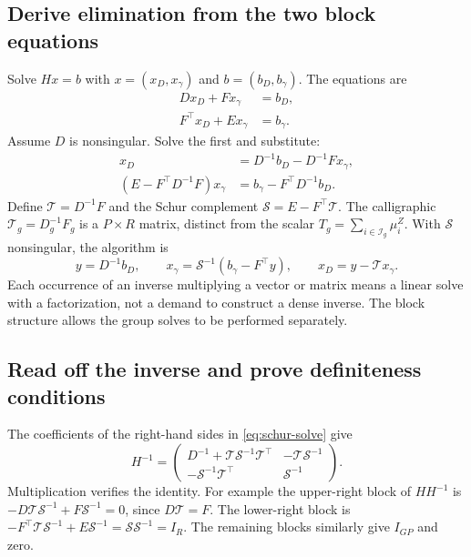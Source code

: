 \documentclass[11pt,a4paper]{article}
\numberwithin{equation}{section}
\begin{document}
\subsection{Derive elimination from the two block equations}
Solve $Hx=b$ with $x=(x_D,x_\gamma)$ and $b=(b_D,b_\gamma)$.
The equations are
\begin{align}
 Dx_D+Fx_\gamma&=b_D,\\
 F^\top x_D+Ex_\gamma&=b_\gamma .
\end{align}
Assume $D$ is nonsingular. Solve the first and substitute:
\begin{align}
 x_D&=D^{-1}b_D-D^{-1}Fx_\gamma,\\
 (E-F^\top D^{-1}F)x_\gamma&=b_\gamma-F^\top D^{-1}b_D.
\end{align}
Define $\mathcal T=D^{-1}F$ and the Schur complement
$\mathcal S=E-F^\top\mathcal T$.
The calligraphic $\mathcal T_g=D_g^{-1}F_g$ is a $P\times R$
matrix, distinct from the scalar $T_g=\sum_{i\in\mathcal I_g}\mu_i^Z$.
With ${\mathcal S}$ nonsingular, the algorithm is
\begin{equation}
 y=D^{-1}b_D,\qquad
 x_\gamma={\mathcal S}^{-1}(b_\gamma-F^\top y),\qquad x_D=y-\mathcal T x_\gamma.
 \label{eq:schur-solve}
\end{equation}
Each occurrence of an inverse multiplying a vector or matrix means a
linear solve with a factorization, not a demand to construct a dense inverse.
The block structure allows the group solves to be performed separately.

\subsection{Read off the inverse and prove definiteness conditions}
The coefficients of the right-hand sides in \eqref{eq:schur-solve} give
\begin{equation}
 H^{-1}=
 \begin{pmatrix}
 D^{-1}+\mathcal T\mathcal S^{-1}\mathcal T^\top&-\mathcal T\mathcal S^{-1}\\
 -\mathcal S^{-1}\mathcal T^\top&\mathcal S^{-1}
 \end{pmatrix}. \label{eq:schur-inverse}
\end{equation}
Multiplication verifies the identity. For example the upper-right block
of $HH^{-1}$ is $-D\mathcal T\mathcal S^{-1}+F\mathcal S^{-1}=0$,
since $D\mathcal T=F$.
The lower-right block is
$-F^\top\mathcal T\mathcal S^{-1}+E\mathcal S^{-1}
=\mathcal S\mathcal S^{-1}=I_R$.
The remaining blocks similarly give $I_{GP}$ and zero.
\end{document}
